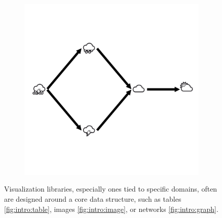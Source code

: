 \documentclass[../main.tex]{subfiles}
\begin{document}
\begin{figure}[H]
\begin{subfigure}{.3\textwidth}
        \includegraphics[width=1\textwidth]{figures/math/graph.png}
        \caption{}
        \label{fig:intro:graph}
    \end{subfigure}
    \caption{Visualization libraries, especially ones tied to specific domains, often are designed around a core data structure, such as tables \autoref{fig:intro:table}, images \autoref{fig:intro:image}, or networks \autoref{fig:intro:graph}.
    }
    \label{fig:intro:data}
\end{figure}
\end{document}

